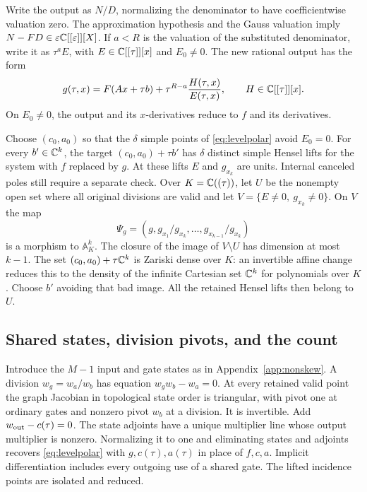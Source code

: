 Write the output as $N/D$, normalizing the denominator to have
coefficientwise valuation zero. The approximation hypothesis and
the Gauss valuation imply $N-FD\in\varepsilon\mathbb C[[\varepsilon]][X]$.
If $a<R$ is the valuation of the substituted denominator, write it
as $\tau^a E$, with $E\in\mathbb C[[\tau]][x]$ and $E_0\ne0$. The new
rational output has the form
\begin{equation}\label{eq:ramifiedoutput}
 g(\tau,x)=F(Ax+\tau b)+\tau^{R-a}\frac{H(\tau,x)}{E(\tau,x)},
 \qquad H\in\mathbb C[[\tau]][x].
\end{equation}
On $E_0\ne0$, the output and its $x$-derivatives reduce to $f$ and
its derivatives.

Choose $(c_0,a_0)$ so that the $\delta$ simple points of
\eqref{eq:levelpolar} avoid $E_0=0$. For every $b'\in\mathbb C^k$,
the target $(c_0,a_0)+\tau b'$ has $\delta$ distinct simple Hensel
lifts for the system with $f$ replaced by $g$. At these lifts $E$
and $g_{x_k}$ are units. Internal canceled poles still require a
separate check. Over $K=\mathbb C((\tau))$, let $U$ be the nonempty open
set where all original divisions are valid and let
$V=\{E\ne0,\ g_{x_k}\ne0\}$. On $V$ the map
\[
 \Psi_g=(g,g_{x_1}/g_{x_k},\ldots,g_{x_{k-1}}/g_{x_k})
\]
is a morphism to $\mathbb A^k_K$. The closure of the image of
$V\setminus U$ has dimension at most $k-1$. The set
$(c_0,a_0)+\tau\mathbb C^k$ is Zariski dense over $K$: an invertible affine
change reduces this to the density of the infinite Cartesian set
$\mathbb C^k$ for polynomials over $K$. Choose $b'$ avoiding that bad image.
All the retained Hensel lifts then belong to $U$.

\subsection*{Shared states, division pivots, and the count}

Introduce the $M-1$ input and gate states as in
Appendix~\ref{app:nonskew}. A division $w_g=w_a/w_b$ has equation
$w_gw_b-w_a=0$. At every retained valid point the graph Jacobian in
topological state order is triangular, with pivot one at ordinary
gates and nonzero pivot $w_b$ at a division. It is invertible.
Add $w_{\rm out}-c(\tau)=0$. The state adjoints have a unique
multiplier line whose output multiplier is nonzero. Normalizing it
to one and eliminating states and adjoints recovers
\eqref{eq:levelpolar} with $g,c(\tau),a(\tau)$ in place of
$f,c,a$. Implicit differentiation includes every outgoing use of a
shared gate. The lifted incidence points are isolated and reduced.

